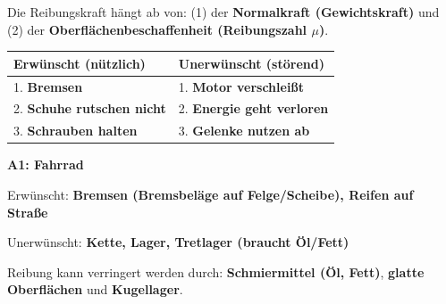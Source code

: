 \documentclass[11pt,a4paper]{article}
\newcommand{\aufgabe}[1]{\noindent\textbf{\textcolor{fachfarbe}{#1}}}
\newcommand{\lsg}[1]{\textcolor{loesung}{\textbf{#1}}}
\begin{document}
\vspace{0.2em}

\begin{merkebox}[title=K4b: Merksatz -- Einflussfaktoren der Reibung]
\small
Die Reibungskraft hängt ab von: (1) der \lsg{Normalkraft (Gewichtskraft)} und (2) der \lsg{Oberflächenbeschaffenheit (Reibungszahl $\mu$)}.
\end{merkebox}

\vspace{0.2em}

\begin{protokollbox}[title=T2: Erwünschte und unerwünschte Reibung]
\small
\renewcommand{\arraystretch}{1.3}
\begin{tabular}{|p{5.8cm}|p{5.8cm}|}
\hline
\textbf{Erwünscht (nützlich)} & \textbf{Unerwünscht (störend)} \\
\hline
1. \lsg{Bremsen} & 1. \lsg{Motor verschleißt} \\[0.3em]
2. \lsg{Schuhe rutschen nicht} & 2. \lsg{Energie geht verloren} \\[0.3em]
3. \lsg{Schrauben halten} & 3. \lsg{Gelenke nutzen ab} \\
\hline
\end{tabular}
\end{protokollbox}

\vspace{0.2em}

\aufgabe{A1: Fahrrad}

Erwünscht: \lsg{Bremsen (Bremsbeläge auf Felge/Scheibe), Reifen auf Straße}

Unerwünscht: \lsg{Kette, Lager, Tretlager (braucht Öl/Fett)}

\vspace{0.2em}
\begin{merkebox}[title=K5: Merksatz -- Reibung verringern]
\small
Reibung kann verringert werden durch: \lsg{Schmiermittel (Öl, Fett)}, \lsg{glatte Oberflächen} und \lsg{Kugellager}.
\end{merkebox}

\vspace{0.4em}
\end{document}
